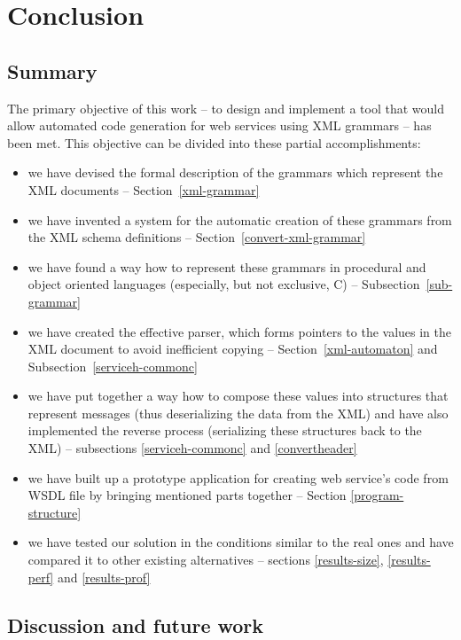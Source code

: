 \documentclass[12pt,notitlepage]{report}
\begin{document}
\chapter{Conclusion}

\section{Summary}
The primary objective of this work -- to design and implement a tool that would allow automated code generation for web services using XML grammars -- has been met. This objective can be divided into these partial accomplishments:
\begin{itemize}
 \item we have devised the formal description of the grammars which represent the XML documents -- Section~\ref{xml-grammar}
 \item we have invented a system for the automatic creation of these grammars from the XML schema definitions -- Section~\ref{convert-xml-grammar}
 \item we have found a way how to represent these grammars in procedural and object oriented languages (especially, but not exclusive, C) -- Subsection~\ref{sub-grammar}
 \item we have created the effective parser, which forms pointers to the values in the XML document to avoid inefficient copying -- Section~\ref{xml-automaton} and Subsection~\ref{serviceh-commonc}
 \item we have put together a way how to compose these values into structures that represent messages (thus deserializing the data from the XML) and have also implemented the reverse process (serializing these structures back to the XML) -- subsections \ref{serviceh-commonc} and \ref{convertheader}
 \item we have built up a prototype application for creating web service's code from WSDL file by bringing mentioned parts together -- Section \ref{program-structure}
 \item we have tested our solution in the conditions similar to the real ones and have compared it to other existing alternatives -- sections \ref{results-size}, \ref{results-perf} and \ref{results-prof}
\end{itemize}

\section{Discussion and future work}
\end{document}

